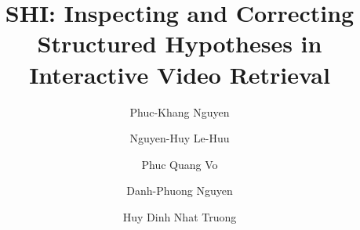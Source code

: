 \documentclass[runningheads]{llncs}
\begin{document}
\title{SHI: Inspecting and Correcting Structured Hypotheses in Interactive Video Retrieval}
\author{Phuc-Khang Nguyen \and
Nguyen-Huy Le-Huu \and
Phuc Quang Vo \and
Danh-Phuong Nguyen \and
Huy Dinh Nhat Truong}
\maketitle







% 

\makeatletter
\renewenvironment{thebibliography}[1]
     {\section*{\refname}
      \def\@biblabel##1{##1.}
      \fontsize{8.5pt}{10.2pt}\selectfont
      \list{\@biblabel{\@arabic\c@enumiv}}%
           {\settowidth\labelwidth{\@biblabel{#1}}%
            \leftmargin\labelwidth
            \advance\leftmargin\labelsep
            \setlength{\itemsep}{-1.5pt}%
            \setlength{\parsep}{0pt}%
            \usecounter{enumiv}%
            \let\p@enumiv\@empty
            \renewcommand\theenumiv{\@arabic\c@enumiv}}%
      \renewcommand\newblock{\hskip .11em \@plus.33em \@minus.07em}%
      \sloppy\clubpenalty4000\widowpenalty4000%
      \sfcode`\.=\@m}
     {\def\@noitemerr
       {\@latex@warning{Empty `thebibliography' environment}}%
      \endlist}
\makeatother



\end{document}
